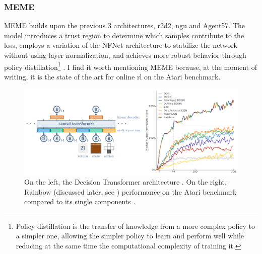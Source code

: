 \subsubsection{MEME}
MEME builds upon the previous 3 architectures, \acrshort{r2d2}, \acrshort{ngu} and Agent57. The model introduces a trust region to determine which samples contribute to the loss, employs a variation of the NFNet architecture to stabilize the network without using layer normalization, and achieves more robust behavior through policy distillation\footnote{Policy distillation is the transfer of knowledge from a more complex policy to a simpler one, allowing the simpler policy to learn and perform well while reducing at the same time the computational complexity of training it.} \cite{meme}. I find it worth mentioning MEME because, at the moment of writing, it is the state of the art for online \acrshort{rl} on the Atari benchmark.

\begin{figure}[!htbp]
\centering
\includegraphics[width=\textwidth]{images/decision-transformer-rainbow.png}
\caption{On the left, the Decision Transformer architecture \cite{decision_transformer}. On the right, Rainbow (discussed later, see ) performance on the Atari benchmark compared to its single components \cite{rainbow}.}
\label{fig:rainbow}
\end{figure}
